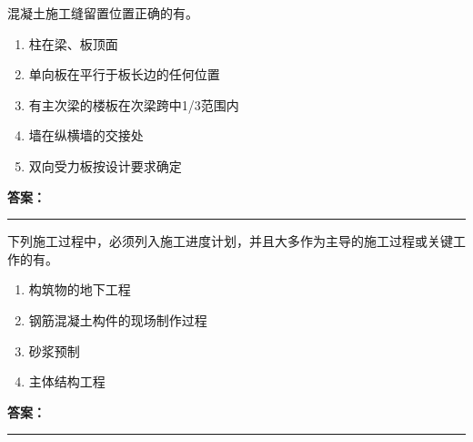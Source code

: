 \documentclass[UTF8,fontset=fandol,11pt]{ctexart}
\newcommand{\answerline}{\textcolor{answerred}{\rule{2.4cm}{0.7pt}}}
\begin{document}
\begin{quizbox}[title={乱序第 233 题｜第四章混凝土结构工程}]

混凝土施工缝留置位置正确的有。\\

\begin{enumerate}[label=\Alph*.]

\item 柱在梁、板顶面

\item 单向板在平行于板长边的任何位置

\item 有主次梁的楼板在次梁跨中1/3范围内

\item 墙在纵横墙的交接处

\item 双向受力板按设计要求确定

\end{enumerate}

\textbf{\textcolor{answerred}{答案：}} \answerline

\end{quizbox}

\vspace{0.2em}

\begin{quizbox}[title={乱序第 234 题｜第十章流水施工原理}]

下列施工过程中，必须列入施工进度计划，并且大多作为主导的施工过程或关键工作的有。\\

\begin{enumerate}[label=\Alph*.]

\item 构筑物的地下工程

\item 钢筋混凝土构件的现场制作过程

\item 砂浆预制

\item 主体结构工程

\end{enumerate}

\textbf{\textcolor{answerred}{答案：}} \answerline

\end{quizbox}

\vspace{0.2em}
\end{document}
